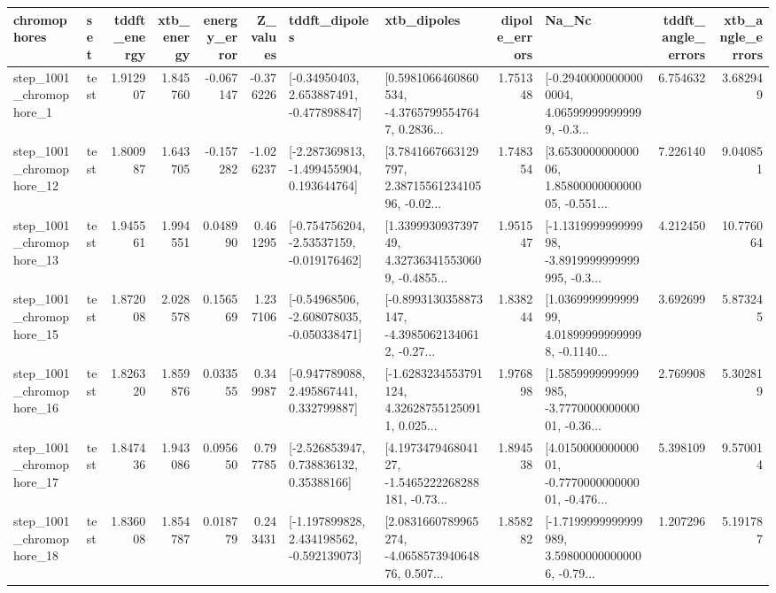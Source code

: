 \begin{tabular}{llrrrrllrlrr}
\toprule
             chromophores &       set &  tddft\_energy &  xtb\_energy &  energy\_error &  Z\_values &                               tddft\_dipoles &                                        xtb\_dipoles &  dipole\_errors &                                              Na\_Nc &  tddft\_angle\_errors &  xtb\_angle\_errors \\
\midrule
  step\_1001\_chromophore\_1 &      test &      1.912907 &    1.845760 &     -0.067147 & -0.376226 &    [-0.34950403, 2.653887491, -0.477898847] &  [0.5981066460860534, -4.37657995547647, 0.2836... &       1.751348 &  [-0.29400000000000004, 4.065999999999999, -0.3... &            6.754632 &          3.682949 \\
 step\_1001\_chromophore\_12 &      test &      1.800987 &    1.643705 &     -0.157282 & -1.026237 &   [-2.287369813, -1.499455904, 0.193644764] &  [3.7841667663129797, 2.3871556123410596, -0.02... &       1.748354 &  [3.653000000000006, 1.8580000000000005, -0.551... &            7.226140 &          9.040851 \\
 step\_1001\_chromophore\_13 &      test &      1.945561 &    1.994551 &      0.048990 &  0.461295 &   [-0.754756204, -2.53537159, -0.019176462] &  [1.339993093739749, 4.327363415530609, -0.4855... &       1.951547 &  [-1.131999999999998, -3.8919999999999995, -0.3... &            4.212450 &         10.776064 \\
 step\_1001\_chromophore\_15 &      test &      1.872008 &    2.028578 &      0.156569 &  1.237106 &   [-0.54968506, -2.608078035, -0.050338471] &  [-0.8993130358873147, -4.39850621340612, -0.27... &       1.838244 &  [1.036999999999999, 4.018999999999998, -0.1140... &            3.692699 &          5.873245 \\
 step\_1001\_chromophore\_16 &      test &      1.826320 &    1.859876 &      0.033555 &  0.349987 &    [-0.947789088, 2.495867441, 0.332799887] &  [-1.6283234553791124, 4.326287551250911, 0.025... &       1.976898 &  [1.5859999999999985, -3.777000000000001, -0.36... &            2.769908 &          5.302819 \\
 step\_1001\_chromophore\_17 &      test &      1.847436 &    1.943086 &      0.095650 &  0.797785 &     [-2.526853947, 0.738836132, 0.35388166] &  [4.197347946804127, -1.5465222268288181, -0.73... &       1.894538 &  [4.015000000000001, -0.777000000000001, -0.476... &            5.398109 &          9.570014 \\
 step\_1001\_chromophore\_18 &      test &      1.836008 &    1.854787 &      0.018779 &  0.243431 &   [-1.197899828, 2.434198562, -0.592139073] &  [2.0831660789965274, -4.065857394064876, 0.507... &       1.858282 &  [-1.7199999999999989, 3.598000000000006, -0.79... &            1.207296 &          5.191787 \\

\end{tabular}
